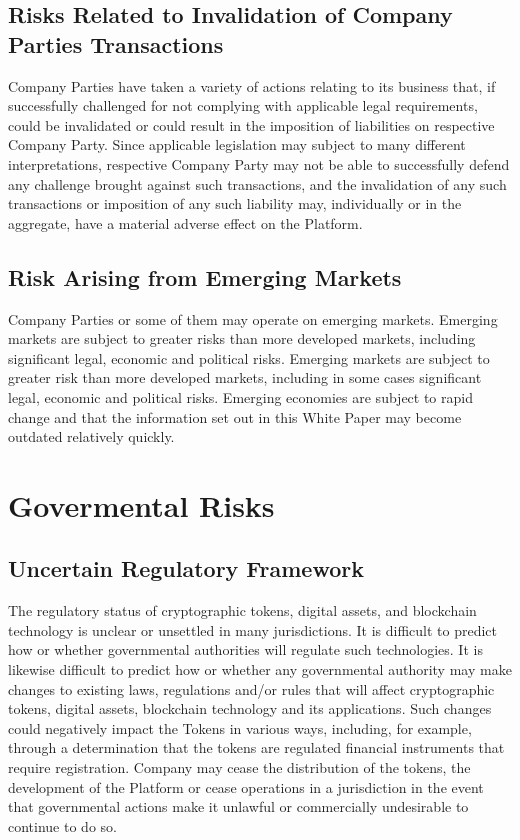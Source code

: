 \documentclass[12pt]{report}
\begin{document}
\subsection*{Risks Related to Invalidation of Company Parties Transactions}
Company Parties have taken a variety of actions relating to its business that, if successfully challenged for not complying with applicable legal requirements, could be invalidated or could result in the imposition of liabilities on respective Company Party. Since applicable legislation may subject to many different interpretations, respective Company Party may not be able to successfully defend any challenge brought against such transactions, and the invalidation of any such transactions or imposition of any such liability may, individually or in the aggregate, have a
material adverse effect on the Platform.

\subsection*{Risk Arising from Emerging Markets}
Company Parties or some of them may operate on emerging markets. Emerging markets are subject to greater risks than more developed markets, including significant legal, economic and political risks. Emerging markets are subject to greater risk than more developed markets, including in some cases significant legal, economic and political risks. Emerging economies are subject to rapid change and that the information set out in this White Paper may become outdated relatively quickly.

\section{Govermental Risks}
\subsection*{Uncertain Regulatory Framework}
The regulatory status of cryptographic tokens, digital assets, and blockchain technology is unclear or unsettled in many jurisdictions. It is difficult to predict how or whether governmental authorities will regulate such technologies. It is likewise difficult to predict how or whether any governmental authority may make changes to existing laws, regulations and/or rules that will affect cryptographic tokens, digital assets, blockchain technology and its applications. Such changes could negatively impact the Tokens in various ways, including, for example, through a determination that the tokens are regulated financial instruments that require registration. Company may cease the distribution of the tokens, the development of the Platform or cease operations in a jurisdiction in the event that governmental actions make it unlawful or commercially undesirable to continue to do so.
\end{document}
